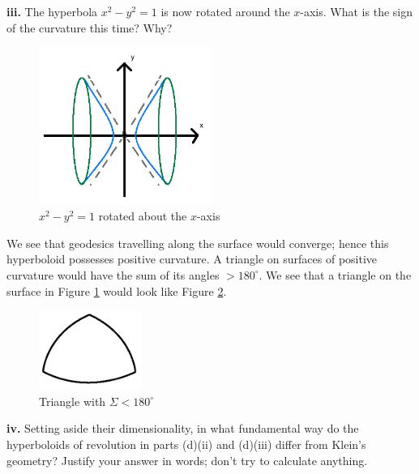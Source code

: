 \documentclass[a4paper]{article} %
\begin{document}
\pagebreak  %

\begin{framed}
\textbf{iii.} The hyperbola $x^2-y^2=1$ is now rotated around the $x$-axis. What is the sign of the curvature this time? Why?
\end{framed}

\begin{figure}[h]
\centering
\includegraphics[width=0.5\textwidth]{images/diii.png}
\caption{$x^2-y^2=1$ rotated about the $x$-axis}
\label{diii figure}
\end{figure}

We see that geodesics travelling along the surface would converge; hence this hyperboloid possesses positive curvature. A triangle on surfaces of positive curvature would have the sum of its angles $> 180^{\circ}$. We see that a triangle on the surface in Figure \ref{diii figure} would look like Figure \ref{pos curv triangle}.

\begin{figure}[h]
\centering
\includegraphics[width=0.3\textwidth]{images/positiveCurvTriangle.png}
\caption{Triangle with $\Sigma<180^{\circ}$}
\label{pos curv triangle}
\end{figure}


\pagebreak  %

\begin{framed}
\textbf{iv.} Setting aside their dimensionality, in what fundamental way do the hyperboloids of revolution in parts (d)(ii) and (d)(iii) differ from Klein's geometry? Justify your answer in words; don’t try to calculate anything.
\end{framed}
\end{document}
